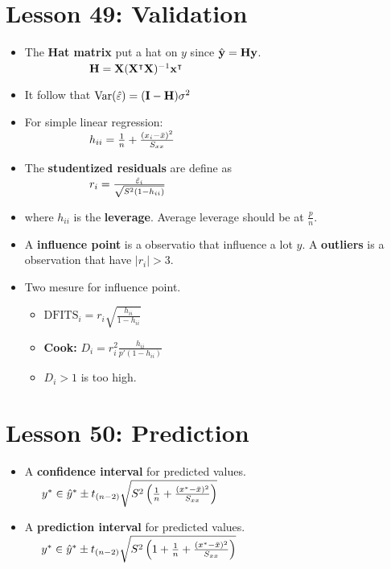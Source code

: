 \documentclass[10pt, french]{article}
\begin{document}
\begin{multicols*}{3}
\section*{Lesson 49: Validation} 
\begin{itemize}[align=left,leftmargin=*]
   \item The \textbf{Hat matrix} put a hat on $y$ since $\hat{\mathbf{y}} = \mathbf{H}\mathbf{y}$. \\
   $\hspace*{2cm} \mathbf{H} = \mathbf{X}(\mathbf{X}^\intercal\mathbf{X})^{-1}\mathbf{x}^\intercal$
   \item It follow that $\mathrm{Var} {\left( \hat{\varepsilon} \right)} = (\mathbf{I} - \mathbf{H})\sigma^2$
   \item For simple linear regression: \\
   $\hspace*{2cm}h_{ii} = \frac{1}{n} + \frac{(x_i - \bar{x})^2}{S_{xx}}$
   \item The \textbf{studentized residuals} are define as \\
   $\hspace*{2cm} r_i = \frac{\hat{\varepsilon}_i}{\sqrt{S^2(1 - h_{ii})}}$
   \item[] where $h_{ii}$ is the \textbf{leverage}. Average leverage should be at $\frac{p}{n}$.
   \item A \textbf{influence point} is a observatio that influence a lot $y$. A \textbf{outliers} is a observation that have $|r_i|>3$. 
   \item Two mesure for influence point.
   \begin{itemize}
      \item $\mathrm{DFITS}_i = r_i \sqrt{\frac{h_{ii}}{1- h_{ii}}}$
      \item \textbf{Cook:} $D_i = r_i^2 \frac{h_{ii}}{p'(1 - h_{ii})}$
      \item[] $D_i>1$ is too high. 
   \end{itemize}
 \end{itemize} 
 
\section*{Lesson 50: Prediction}
\begin{itemize}[align=left,leftmargin=*]
    \item A \textbf{confidence interval} for predicted values. \\
    $\hspace*{0.5cm}y^{*} \in \hat{y}^{*} \pm t_{(n-2)} \sqrt{S^2\left(\frac{1}{n}+\frac{(x^{*} - \bar{x})^2}{S_{xx}}\right)}$
    \item A \textbf{prediction interval} for predicted values. \\
    $\hspace*{0.5cm}y^{*} \in \hat{y}^{*} \pm t_{(n-2)} \sqrt{S^2\left(1+\frac{1}{n}+\frac{(x^{*} - \bar{x})^2}{S_{xx}}\right)}$
\end{itemize}
 

\end{multicols*}
\end{document}
